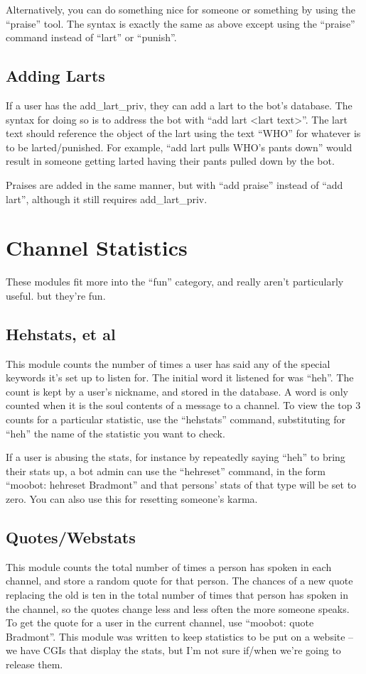 \documentclass[titlepage]{article}
\begin{document}
		Alternatively, you can do something nice for someone or something by
		using the ``praise'' tool.  The syntax is exactly the same as above
		except using the ``praise'' command instead of ``lart'' or ``punish''.

		\subsection{Adding Larts}
			If a user has the add\_lart\_priv, they can add a lart to the
			bot's database.  The syntax for doing so is to address the bot
			with ``add lart <lart text>''.  The lart text should reference the
			object of the lart using the text ``WHO'' for whatever is to be
			larted/punished.  For example, ``add lart pulls WHO's pants down''
			would result in someone getting larted having their pants pulled
			down by the bot.

			Praises are added in the same manner, but with ``add praise''
			instead of ``add lart'', although it still requires
			add\_lart\_priv.

	\section{Channel Statistics}
		These modules fit more into the ``fun'' category, and really 
		aren't particularly useful.  but they're fun.
		\subsection{Hehstats, et al}
			This module counts the number of times a user has said
			any of the special keywords it's set up to listen for.  The
			initial word it listened for was ``heh''.  The count is kept
			by a user's nickname, and stored in the database.  A word is
			only counted when it is the soul contents of a message to a
			channel.  To view the top 3 counts for a particular
			statistic, use the ``hehstats'' command, substituting for
			``heh'' the name of the statistic you want to check.

			If a user is abusing the stats, for instance by repeatedly
			saying ``heh'' to bring their stats up, a bot admin can use
			the ``hehreset'' command, in the form ``moobot: hehreset 
			Bradmont'' and that persons' stats of that type will be set
			to zero.  You can also use this for resetting someone's
			karma.
			
		\subsection{Quotes/Webstats}
			This module counts the total number of times a person has
			spoken in each channel, and store a random quote for that
			person.  The chances of a new quote replacing the old is
			ten in the total number of times that person has spoken in
			the channel, so the quotes change less and less often the
			more someone speaks.  To get the quote for a user in the
			current channel, use ``moobot:  quote Bradmont''.  This
			module was written to keep statistics to be put on a
			website -- we have CGIs that display the stats, but I'm not
			sure if/when we're going to release them.
\end{document}
